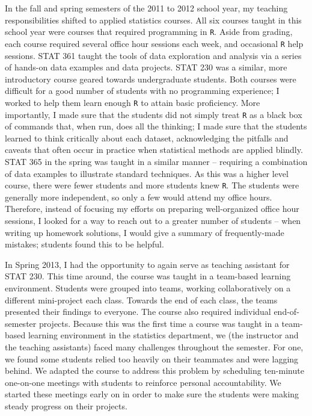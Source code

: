 \documentclass[11pt]{article}
\begin{document}
In the fall and spring semesters of the 2011 to 2012 school year, my teaching responsibilities shifted to applied statistics courses. All six courses taught in this school year were courses that required programming in \verb|R|. Aside from grading, each course required several office hour sessions each week, and occasional \verb|R| help sessions. STAT 361 taught the tools of data exploration and analysis via a series of hands-on data examples and data projects. STAT 230 was a similar, more introductory course geared towards undergraduate students. Both courses were difficult for a good number of students with no programming experience; I worked to help them learn enough \verb|R| to attain basic proficiency. More importantly, I made sure that the students did not simply treat \verb|R| as a black box of commands that, when run, does all the thinking; I made sure that the students learned to think critically about each dataset, acknowledging the pitfalls and caveats that often occur in practice when statistical methods are applied blindly. STAT 365 in the spring was taught in a similar manner -- requiring a combination of data examples to illustrate standard techniques. As this was a higher level course, there were fewer students and more students knew \verb|R|. The students were generally more independent, so only a few would attend my office hours. Therefore, instead of focusing my efforts on preparing well-organized office hour sessions, I looked for a way to reach out to a greater number of students -- when writing up homework solutions, I would give a summary of frequently-made mistakes; students found this to be helpful. 

In Spring 2013, I had the opportunity to again serve as teaching assistant for STAT 230. This time around, the course was taught in a team-based learning environment. Students were grouped into teams, working collaboratively on a different mini-project each class. Towards the end of each class, the teams presented their findings to everyone. The course also required individual end-of-semester projects. Because this was the first time a course was taught in a team-based learning environment in the statistics department, we (the instructor and the teaching assistants) faced many challenges throughout the semester. For one, we found some students relied too heavily on their teammates and were lagging behind. We adapted the course to address this problem by scheduling ten-minute one-on-one meetings with students to reinforce personal accountability. We started these meetings early on in order to make sure the students were making steady progress on their projects. 
\end{document}
